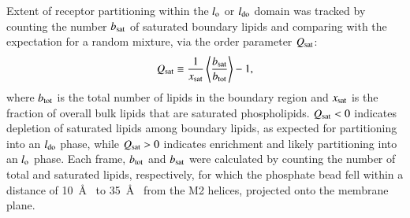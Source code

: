 Extent of receptor partitioning within the $l_{\mathrm{o}}$ or $l_{\mathrm{do}}$ domain was tracked by counting the number $b_{\mathrm{sat}}$ of saturated boundary lipids and comparing with the expectation for a random mixture, via the order parameter $Q_{\mathrm{sat}}$:
  \begin{equation}
    \begin{aligned}
      Q_{\mathrm{sat}}\equiv \frac{1}{x_{\mathrm{sat}}}\left\langle\frac{  b_{\mathrm{sat}} }{b_{\mathrm{tot}} }\right\rangle-1,\\
    \end{aligned}
    \label{eq:Q}
  \end{equation}
  where $b_{\mathrm{tot}}$ is the total number of lipids in the boundary region and $x_{\mathrm{sat}}$ is the fraction of overall bulk lipids that are saturated phospholipids. $Q_{\mathrm{sat}} <0$ indicates depletion of saturated lipids among boundary lipids, as expected for partitioning into an $l_{\mathrm{do}}$ phase, while $Q_{\mathrm{sat}}>0$ indicates enrichment and likely partitioning into an $l_{\mathrm{o}}$ phase. Each frame, $b_{\mathrm{tot}}$ and $b_{\mathrm{sat}}$ were calculated by counting the number of total and saturated lipids, respectively, for which the phosphate bead fell within a distance of 10~\AA~ to 35~\AA~ from the M2 helices, projected onto the membrane plane. 
  
